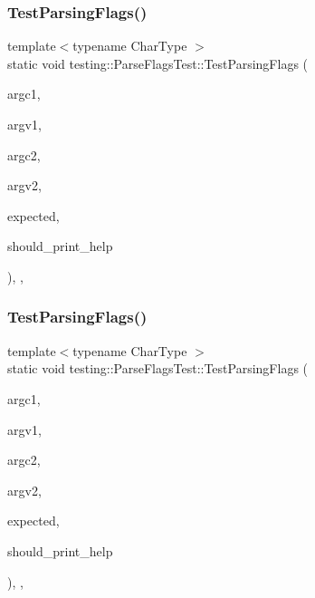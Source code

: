 \subsubsection{\texorpdfstring{TestParsingFlags()}{TestParsingFlags()}\hspace{0.1cm}{\footnotesize\ttfamily [2/3]}}
{\footnotesize\ttfamily template$<$typename Char\+Type $>$ \\
static void testing\+::\+Parse\+Flags\+Test\+::\+Test\+Parsing\+Flags (\begin{DoxyParamCaption}\item[{int}]{argc1,  }\item[{const Char\+Type $\ast$$\ast$}]{argv1,  }\item[{int}]{argc2,  }\item[{const Char\+Type $\ast$$\ast$}]{argv2,  }\item[{const \mbox{\hyperlink{structtesting_1_1_flags}{Flags}} \&}]{expected,  }\item[{bool}]{should\+\_\+print\+\_\+help }\end{DoxyParamCaption})\hspace{0.3cm}{\ttfamily [inline]}, {\ttfamily [static]}, {\ttfamily [protected]}}

\mbox{\label{classtesting_1_1_parse_flags_test_ad769e5f5a71939c3a9ad853b415fa9d2}} 
\subsubsection{\texorpdfstring{TestParsingFlags()}{TestParsingFlags()}\hspace{0.1cm}{\footnotesize\ttfamily [3/3]}}
{\footnotesize\ttfamily template$<$typename Char\+Type $>$ \\
static void testing\+::\+Parse\+Flags\+Test\+::\+Test\+Parsing\+Flags (\begin{DoxyParamCaption}\item[{int}]{argc1,  }\item[{const Char\+Type $\ast$$\ast$}]{argv1,  }\item[{int}]{argc2,  }\item[{const Char\+Type $\ast$$\ast$}]{argv2,  }\item[{const \mbox{\hyperlink{structtesting_1_1_flags}{Flags}} \&}]{expected,  }\item[{bool}]{should\+\_\+print\+\_\+help }\end{DoxyParamCaption})\hspace{0.3cm}{\ttfamily [inline]}, {\ttfamily [static]}, {\ttfamily [protected]}}



